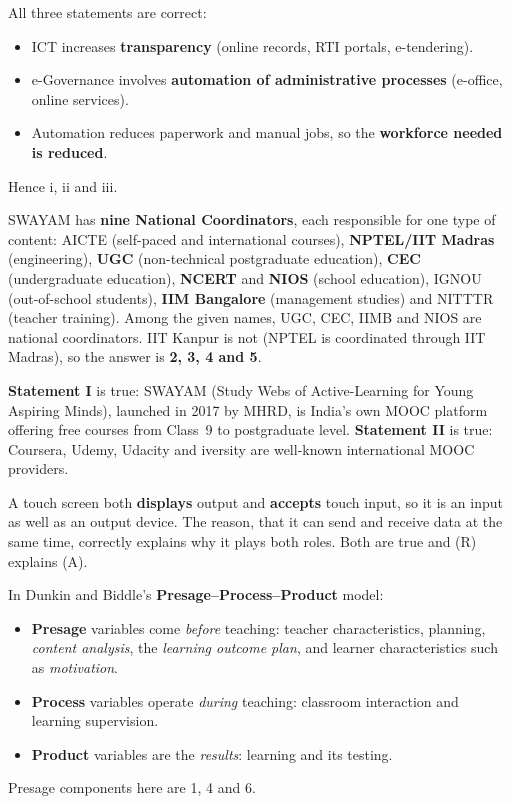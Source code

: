 All three statements are correct:
\begin{itemize}
\item ICT increases \textbf{transparency} (online records, RTI portals, e-tendering).
\item e-Governance involves \textbf{automation of administrative processes} (e-office, online services).
\item Automation reduces paperwork and manual jobs, so the \textbf{workforce needed is reduced}.
\end{itemize}
Hence i, ii and iii.

SWAYAM has \textbf{nine National Coordinators}, each responsible for one type of content: AICTE (self-paced and international courses), \textbf{NPTEL/IIT Madras} (engineering), \textbf{UGC} (non-technical postgraduate education), \textbf{CEC} (undergraduate education), \textbf{NCERT} and \textbf{NIOS} (school education), IGNOU (out-of-school students), \textbf{IIM Bangalore} (management studies) and NITTTR (teacher training).
Among the given names, UGC, CEC, IIMB and NIOS are national coordinators. IIT Kanpur is not (NPTEL is coordinated through IIT Madras), so the answer is \textbf{2, 3, 4 and 5}.

\textbf{Statement I} is true: SWAYAM (Study Webs of Active-Learning for Young Aspiring Minds), launched in 2017 by MHRD, is India's own MOOC platform offering free courses from Class~9 to postgraduate level. \textbf{Statement II} is true: Coursera, Udemy, Udacity and iversity are well-known international MOOC providers.

A touch screen both \textbf{displays} output and \textbf{accepts} touch input, so it is an input as well as an output device. The reason, that it can send and receive data at the same time, correctly explains why it plays both roles. Both are true and (R) explains (A).

In Dunkin and Biddle's \textbf{Presage--Process--Product} model:
\begin{itemize}
\item \textbf{Presage} variables come \emph{before} teaching: teacher characteristics, planning, \emph{content analysis}, the \emph{learning outcome plan}, and learner characteristics such as \emph{motivation}.
\item \textbf{Process} variables operate \emph{during} teaching: classroom interaction and learning supervision.
\item \textbf{Product} variables are the \emph{results}: learning and its testing.
\end{itemize}
Presage components here are 1, 4 and 6.

